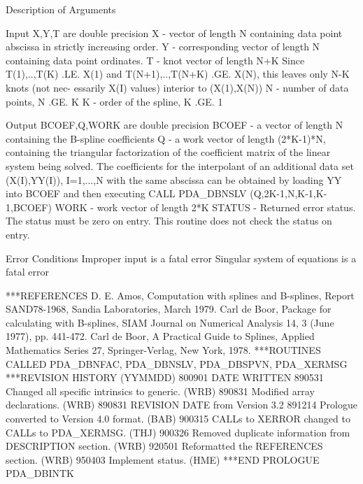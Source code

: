 \documentclass[11pt,twoside,nolof]{starlink}
\begin{document}
\begin{terminalv}
     Description of Arguments

         Input       X,Y,T are double precision
           X       - vector of length N containing data point abscissa
                     in strictly increasing order.
           Y       - corresponding vector of length N containing data
                     point ordinates.
           T       - knot vector of length N+K
                     Since T(1),..,T(K) .LE. X(1) and T(N+1),..,T(N+K)
                     .GE. X(N), this leaves only N-K knots (not nec-
                     essarily X(I) values) interior to (X(1),X(N))
           N       - number of data points, N .GE. K
           K       - order of the spline, K .GE. 1

         Output      BCOEF,Q,WORK are double precision
           BCOEF   - a vector of length N containing the B-spline
                     coefficients
           Q       - a work vector of length (2*K-1)*N, containing
                     the triangular factorization of the coefficient
                     matrix of the linear system being solved.  The
                     coefficients for the interpolant of an
                     additional data set (X(I),YY(I)), I=1,...,N
                     with the same abscissa can be obtained by loading
                     YY into BCOEF and then executing
                         CALL PDA_DBNSLV (Q,2K-1,N,K-1,K-1,BCOEF)
           WORK    - work vector of length 2*K
           STATUS  - Returned error status.
                     The status must be zero on entry. This
                     routine does not check the status on entry.

     Error Conditions
         Improper input is a fatal error
         Singular system of equations is a fatal error

***REFERENCES  D. E. Amos, Computation with splines and B-splines,
                 Report SAND78-1968, Sandia Laboratories, March 1979.
               Carl de Boor, Package for calculating with B-splines,
                 SIAM Journal on Numerical Analysis 14, 3 (June 1977),
                 pp. 441-472.
               Carl de Boor, A Practical Guide to Splines, Applied
                 Mathematics Series 27, Springer-Verlag, New York,
                 1978.
***ROUTINES CALLED  PDA_DBNFAC, PDA_DBNSLV, PDA_DBSPVN, PDA_XERMSG
***REVISION HISTORY  (YYMMDD)
   800901  DATE WRITTEN
   890531  Changed all specific intrinsics to generic.  (WRB)
   890831  Modified array declarations.  (WRB)
   890831  REVISION DATE from Version 3.2
   891214  Prologue converted to Version 4.0 format.  (BAB)
   900315  CALLs to XERROR changed to CALLs to PDA_XERMSG.  (THJ)
   900326  Removed duplicate information from DESCRIPTION section.
           (WRB)
   920501  Reformatted the REFERENCES section.  (WRB)
   950403  Implement status.  (HME)
***END PROLOGUE  PDA_DBINTK
\end{terminalv}
\end{document}
